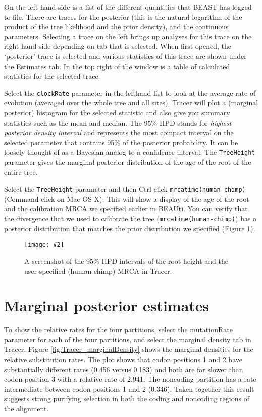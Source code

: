 \documentclass[11pt]{article}
\theoremstyle{plain}%
\theoremstyle{definition}
\theoremstyle{remark}
\newcommand{\includeimage}[2][]{%
\texttt{[image: \#2]}
}
\begin{document}
On the left hand side is a list of the different quantities that BEAST has logged to file. 
There are traces for the posterior (this
is the natural logarithm of the product of the tree likelihood and the prior density), and the continuous parameters. Selecting a trace
on the left brings up analyses for this trace on the right hand side depending on tab that is selected. When first opened, the
`posterior' trace is selected and various statistics of this trace are shown under the Estimates tab.
In the top right of the window is a table of calculated statistics for the selected trace. 

Select the \texttt{clockRate} parameter in the lefthand list to look at
the average rate of evolution (averaged over the whole tree and all sites). Tracer will plot a (marginal posterior) histogram for the selected statistic and also give you
summary statistics such as the mean and median. The 95\% HPD stands for {\it highest posterior density interval} and represents the most compact interval on the selected parameter that contains 95\% of the posterior probability. It can be loosely thought of as a Bayesian analog to a confidence interval. The \texttt{TreeHeight} parameter gives the marginal posterior distribution of the age of the root of the entire tree.

Select the \texttt{TreeHeight} parameter and then Ctrl-click \texttt{mrcatime(human-chimp)}  (Command-click on Mac OS X). This will show a display of the age of the root and the calibration MRCA we specified earlier in BEAUti. You can verify that the divergence that we used to calibrate the tree
(\texttt{mrcatime(human-chimp)}) has a posterior distribution that matches the prior distribution we specified (Figure \ref{fig:Tracer_divergences}).

\begin{figure}
\centering	
\includeimage[width=0.9\textwidth]{figures/Tracer_divergences}
\label{fig:Tracer_divergences}
\caption{A screenshot of the 95\% HPD intervals of the root height and the user-specified (human-chimp) MRCA in Tracer.}
\end{figure}

\section{Marginal posterior estimates}

To show the relative rates for the four partitions, select the mutationRate parameter for each of the four partitions, and select the marginal density tab in Tracer.
Figure \ref{fig:Tracer_marginalDensity} shows the marginal densities for the relative substitution rates. The
plot shows that codon positions 1 and 2 have substantially different rates (0.456
versus 0.183) and both are far slower than codon position 3 with a relative rate of
2.941. The noncoding partition has a rate intermediate between codon positions
1 and 2 (0.346). Taken together this result suggests strong purifying selection in
both the coding and noncoding regions of the alignment.
\end{document}
